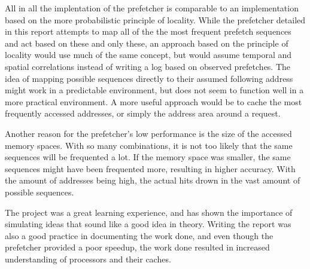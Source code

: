 All in all the implentation of the prefetcher is comparable to an implementation based on the more probabilistic principle of locality. While the prefetcher detailed in this report attempts to map all of the the most frequent prefetch sequences and act based on these and only these, an approach based on the principle of locality would use much of the same concept, but would assume temporal and spatial correlations instead of writing a log based on observed prefetches. The idea of mapping possible sequences directly to their assumed following address might work in a predictable environment, but does not seem to function well in a more practical environment. A more useful approach would be to cache the most frequently accessed addresses, or simply the address area around a request. 

Another reason for the prefetcher's low performance is the size of the accessed memory spaces. With so many combinations, it is not too likely that the same sequences will be frequented a lot. If the memory space was smaller, the same sequences might have been frequented more, resulting in higher accuracy. With the amount of addresses being high, the actual hits drown in the vast amount of possible sequences.

The project was a great learning experience, and has shown the importance of simulating ideas that sound like a good idea in theory. Writing the report was also a good practice in documenting the work done, and even though the prefetcher provided a poor speedup, the work done resulted in increased understanding of processors and their caches.
